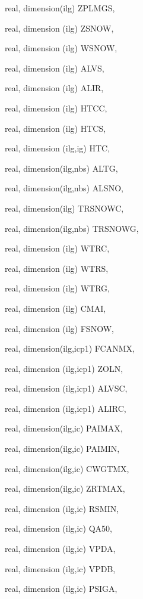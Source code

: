 {\begin{DoxyParamCaption}
\item[{real, dimension(ilg)}]{Z\+P\+L\+M\+G\+S, }
\item[{real, dimension (ilg)}]{Z\+S\+N\+O\+W, }
\item[{real, dimension (ilg)}]{W\+S\+N\+O\+W, }
\item[{real, dimension  (ilg)}]{A\+L\+V\+S, }
\item[{real, dimension  (ilg)}]{A\+L\+I\+R, }
\item[{real, dimension  (ilg)}]{H\+T\+C\+C, }
\item[{real, dimension  (ilg)}]{H\+T\+C\+S, }
\item[{real, dimension   (ilg,ig)}]{H\+T\+C, }
\item[{real, dimension(ilg,nbs)}]{A\+L\+T\+G, }
\item[{real, dimension(ilg,nbs)}]{A\+L\+S\+N\+O, }
\item[{real, dimension(ilg)}]{T\+R\+S\+N\+O\+W\+C, }
\item[{real, dimension(ilg,nbs)}]{T\+R\+S\+N\+O\+W\+G, }
\item[{real, dimension  (ilg)}]{W\+T\+R\+C, }
\item[{real, dimension  (ilg)}]{W\+T\+R\+S, }
\item[{real, dimension  (ilg)}]{W\+T\+R\+G, }
\item[{real, dimension  (ilg)}]{C\+M\+A\+I, }
\item[{real, dimension (ilg)}]{F\+S\+N\+O\+W, }
\item[{real, dimension(ilg,icp1)}]{F\+C\+A\+N\+M\+X, }
\item[{real, dimension  (ilg,icp1)}]{Z\+O\+L\+N, }
\item[{real, dimension (ilg,icp1)}]{A\+L\+V\+S\+C, }
\item[{real, dimension (ilg,icp1)}]{A\+L\+I\+R\+C, }
\item[{real, dimension(ilg,ic)}]{P\+A\+I\+M\+A\+X, }
\item[{real, dimension(ilg,ic)}]{P\+A\+I\+M\+I\+N, }
\item[{real, dimension(ilg,ic)}]{C\+W\+G\+T\+M\+X, }
\item[{real, dimension(ilg,ic)}]{Z\+R\+T\+M\+A\+X, }
\item[{real, dimension (ilg,ic)}]{R\+S\+M\+I\+N, }
\item[{real, dimension  (ilg,ic)}]{Q\+A50, }
\item[{real, dimension  (ilg,ic)}]{V\+P\+D\+A, }
\item[{real, dimension  (ilg,ic)}]{V\+P\+D\+B, }
\item[{real, dimension (ilg,ic)}]{P\+S\+I\+G\+A, }

\end{DoxyParamCaption}}
